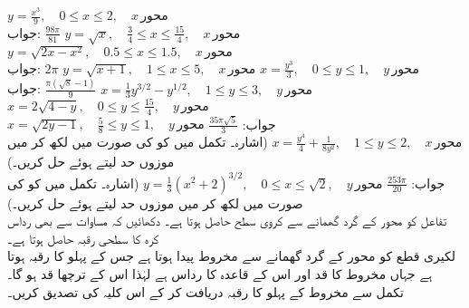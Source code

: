 $y=\tfrac{x^3}{9},\quad 0\le x\le 2,\quad x\,\text{محور}$\\
جواب:\quad
$\tfrac{98\pi}{81}$
$y=\sqrt{x},\quad \tfrac{3}{4}\le x\le \tfrac{15}{4},\quad x\,\text{محور}$
$y=\sqrt{2x-x^2},\quad 0.5\le x\le 1.5,\quad x\,\text{محور}$\\
جواب:\quad
$2\pi$
$y=\sqrt{x+1},\quad 1\le x\le 5,\quad x\,\text{محور}$
$x=\tfrac{y^3}{3},\quad 0\le y\le 1,\quad y\,\text{محور}$\\
جواب:\quad
$\tfrac{\pi(\sqrt{8}-1)}{9}$
$x=\tfrac{1}{3}y^{3/2}-y^{1/2},\quad 1\le y\le 3,\quad y\,\text{محور}$
$x=2\sqrt{4-y},\quad 0\le y\le \tfrac{15}{4},\quad y\,\text{محور}$\\
جواب:\quad
$\tfrac{35\pi\sqrt{5}}{3}$
$x=\sqrt{2y-1},\quad \tfrac{5}{8}\le y\le 1,\quad y\,\text{محور}$
$x=\tfrac{y^4}{4}+\tfrac{1}{8y^2},\quad 1\le y\le 2,\quad x\,\text{محور}$
\quad
(اشارہ۔ تکمل میں  کو  کی صورت میں لکھ کر  میں موزوں حد لیتے ہوئے حل کریں۔)\\
جواب:\quad
$\tfrac{253\pi}{20}$
$y=\tfrac{1}{3}(x^2+2)^{3/2},\quad 0\le x\le \sqrt{2},\quad y\,\text{محور}$
\quad
(اشارہ۔ تکمل میں  کو  کی صورت میں لکھ کر  میں موزوں حد لیتے ہوئے حل کریں۔)
\\
تفاعل  کو  محور کے گرد گھمانے سے کروی سطح حاصل ہوتا ہے۔ دکھائیں کہ مساوات  سے بھی رداس  کرہ کا سطحی رقبہ  حاصل ہوتا ہے۔
\\
لکیری قطع  کو  محور کے گرد گھمانے سے مخروط پیدا ہوتا ہے جس کے پہلو کا رقبہ  ہوتا ہے جہاں مخروط کا قد  اور اس کے قاعدہ کا رداس  ہے لہٰذا اس کے ترچھا قد  ہو گا۔ تکمل سے مخروط کے پہلو کا رقبہ دریافت کر کے اس کلیہ کی تصدیق کریں۔ 
